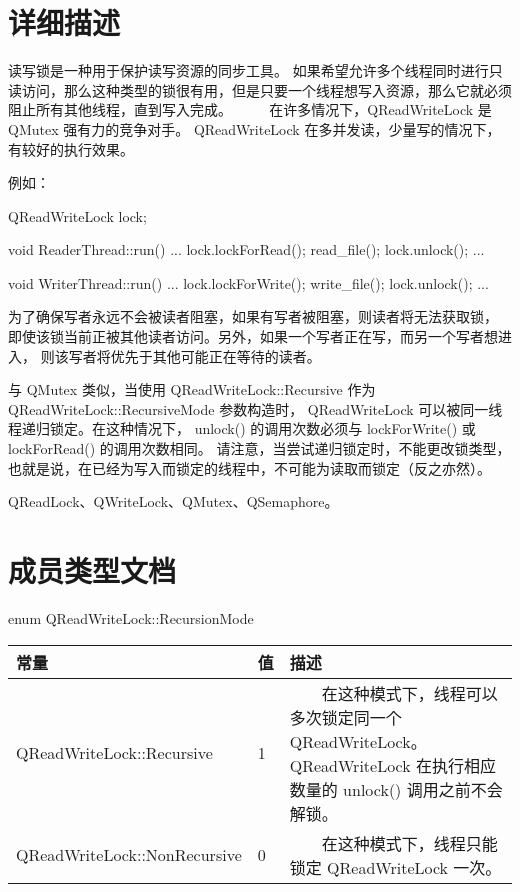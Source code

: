 \section{详细描述}

读写锁是一种用于保护读写资源的同步工具。
如果希望允许多个线程同时进行只读访问，那么这种类型的锁很有用，但是只要一个线程想写入资源，那么它就必须阻止所有其他线程，直到写入完成。
  
在许多情况下，QReadWriteLock 是 QMutex 强有力的竞争对手。
QReadWriteLock 在多并发读，少量写的情况下，有较好的执行效果。

例如：

\begin{cppcode}
QReadWriteLock lock;

void ReaderThread::run()
{
    ...
    lock.lockForRead();
    read_file();
    lock.unlock();
    ...
}
    
void WriterThread::run()
{
    ...
    lock.lockForWrite();
    write_file();
    lock.unlock();
    ...
}
\end{cppcode}

为了确保写者永远不会被读者阻塞，如果有写者被阻塞，则读者将无法获取锁，
即使该锁当前正被其他读者访问。另外，如果一个写者正在写，而另一个写者想进入，
则该写者将优先于其他可能正在等待的读者。

与 QMutex 类似，当使用 QReadWriteLock::Recursive 作为 QReadWriteLock::RecursiveMode 参数构造时，
QReadWriteLock 可以被同一线程递归锁定。在这种情况下，
unlock() 的调用次数必须与 lockForWrite() 或 lockForRead() 的调用次数相同。
请注意，当尝试递归锁定时，不能更改锁类型，也就是说，在已经为写入而锁定的线程中，不可能为读取而锁定（反之亦然）。

\begin{seeAlso}
QReadLock、QWriteLock、QMutex、QSemaphore。
\end{seeAlso}

\section{成员类型文档}

enum QReadWriteLock::RecursionMode

\begin{tabular}{|l|l|l|}
\hline
常量 &	值  &	描述 \\ 
\hline
QReadWriteLock::Recursive  &	1  &	  在这种模式下，线程可以多次锁定同一个 QReadWriteLock。QReadWriteLock 在执行相应数量的 unlock() 调用之前不会解锁。 \\ 
\hline
QReadWriteLock::NonRecursive &	0 	&  在这种模式下，线程只能锁定 QReadWriteLock 一次。 \\ 
\hline
\end{tabular}


